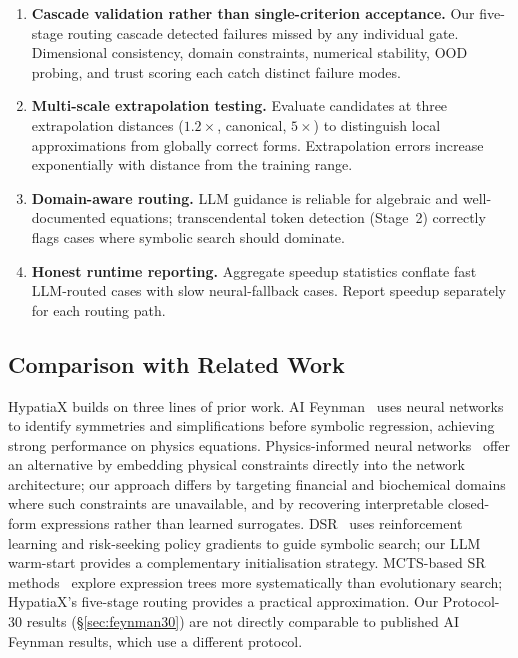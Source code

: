 \documentclass[twoside,11pt]{article}
\begin{document}
\begin{enumerate}
  \item \textbf{Cascade validation rather than single-criterion acceptance.} Our five-stage routing cascade detected failures missed by any individual gate. Dimensional consistency, domain constraints, numerical stability, OOD probing, and trust scoring each catch distinct failure modes.
  \item \textbf{Multi-scale extrapolation testing.} Evaluate candidates at three extrapolation distances ($1.2\times$, canonical, $5\times$) to distinguish local approximations from globally correct forms. Extrapolation errors increase exponentially with distance from the training range.
  \item \textbf{Domain-aware routing.} LLM guidance is reliable for algebraic and well-documented equations; transcendental token detection (Stage~2) correctly flags cases where symbolic search should dominate.
  \item \textbf{Honest runtime reporting.} Aggregate speedup statistics conflate fast LLM-routed cases with slow neural-fallback cases. Report speedup separately for each routing path.
\end{enumerate}

\subsection{Comparison with Related Work}\label{subsec:comparison-with-related-work}
\label{sec:disc_related}

HypatiaX builds on three lines of prior work. AI Feynman~\citep{udrescu2020ai} uses neural networks to identify symmetries and simplifications before symbolic regression, achieving strong performance on physics equations. Physics-informed neural networks~\citep{raissi2019physics,karniadakis2021physics} offer an alternative by embedding physical constraints directly into the network architecture; our approach differs by targeting financial and biochemical domains where such constraints are unavailable, and by recovering interpretable closed-form expressions rather than learned surrogates. DSR~\citep{petersen2021deep,landajuela2022unified} uses reinforcement learning and risk-seeking policy gradients to guide symbolic search; our LLM warm-start provides a complementary initialisation strategy. MCTS-based SR methods~\citep{sun2022symbolic} explore expression trees more systematically than evolutionary search; HypatiaX's five-stage routing provides a practical approximation. Our Protocol-30 results (\S\ref{sec:feynman30}) are not directly comparable to published AI Feynman results, which use a different protocol.
\end{document}
